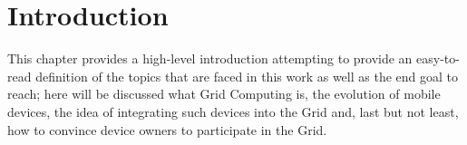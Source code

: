 \chapter{Introduction}
This chapter provides a high-level introduction attempting to provide an easy-to-read definition of the topics that are faced in this work as well as the end goal to reach; here will be discussed what Grid Computing is, the evolution of mobile devices, the idea of integrating such devices into the Grid and, last but not least, how to convince device owners to participate in the Grid.





